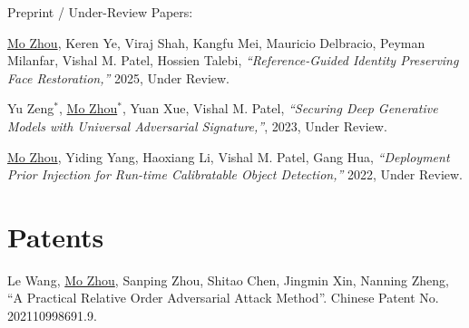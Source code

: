 \documentclass[10pt,margin,line,pifont,palatino,courier]{res}
\begin{document}
\begin{resume}
\begin{enumerate}[noitemsep, leftmargin=*, label={[C{\arabic*}]}]
\end{enumerate}

    {\sc Preprint / Under-Review Papers:}\\

\begin{enumerate}[noitemsep, leftmargin=*, label={[X0{\arabic*}]}]


\item \underline{Mo Zhou}, Keren Ye, Viraj Shah, Kangfu Mei, Mauricio Delbracio,
\reversemarginpar{}
Peyman Milanfar, Vishal M. Patel, Hossien Talebi,
\textit{``Reference-Guided Identity Preserving Face Restoration,''}
2025, Under Review.

\item Yu Zeng$^*$, \underline{Mo Zhou}$^*$, Yuan Xue, Vishal M. Patel,
\reversemarginpar{}
\textit{``Securing Deep Generative Models with Universal Adversarial Signature,''},
2023, Under Review.

\item \underline{Mo Zhou}, Yiding Yang, Haoxiang Li, Vishal M. Patel, Gang Hua,
\reversemarginpar{}
\textit{``Deployment Prior Injection for Run-time Calibratable Object Detection,''}
2022, Under Review.

\end{enumerate}

\section{\sc Patents}

\begin{enumerate}[noitemsep, leftmargin=*, label={[P0{\arabic*}]}]



\item Le Wang, \underline{Mo Zhou}, Sanping Zhou, Shitao Chen, Jingmin Xin, Nanning Zheng,
    ``A Practical Relative Order Adversarial Attack Method''.
    Chinese Patent No. 202110998691.9.


\end{enumerate}
\end{resume}
\end{document}
